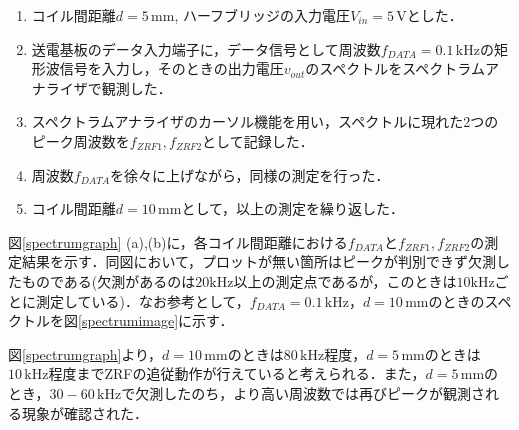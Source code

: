 \begin{enumerate}
  \item コイル間距離$d =5 \, \mathrm{mm}$, ハーフブリッジの入力電圧$V_{in}=5 \, \mathrm{V}$とした．
  \item 送電基板のデータ入力端子に，データ信号として周波数$f_{DATA}=0.1 \, \mathrm{kHz}$の矩形波信号を入力し，そのときの出力電圧$v_{out}$のスペクトルをスペクトラムアナライザで観測した．
  \item スペクトラムアナライザのカーソル機能を用い，スペクトルに現れた2つのピーク周波数を$f_{ZRF1},f_{ZRF2}$として記録した．
  \item 周波数$f_{DATA}$を徐々に上げながら，同様の測定を行った．
  \item コイル間距離$d =10 \, \mathrm{mm}$として，以上の測定を繰り返した．
\end{enumerate}
図\ref{spectrumgraph} (a),(b)に，各コイル間距離における$f_{DATA}$と$f_{ZRF1},f_{ZRF2}$の測定結果を示す．同図において，プロットが無い箇所はピークが判別できず欠測したものである(欠測があるのは$20 \mathrm{kHz}$以上の測定点であるが，このときは$10 \mathrm{kHz}$ごとに測定している)．なお参考として，$f_{DATA}=0.1 \, \mathrm{kHz}$，$d=10 \, \mathrm{mm}$のときのスペクトルを図\ref{spectrumimage}に示す．\par
図\ref{spectrumgraph}より，$d=10 \, \mathrm{mm}$のときは$80 \, \mathrm{kHz}$程度，$d=5 \, \mathrm{mm}$のときは$10 \, \mathrm{kHz}$程度までZRFの追従動作が行えていると考えられる．また，$d=5 \, \mathrm{mm}$のとき，$30-60 \, \mathrm{kHz}$で欠測したのち，より高い周波数では再びピークが観測される現象が確認された．

